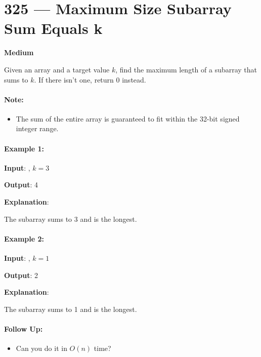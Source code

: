 \section{325 --- Maximum Size Subarray Sum Equals k}

\textbf{Medium}

Given an array  and a target value $k$, find the maximum length of a subarray that sums to $k$. If there isn't one, return 0 instead.

\paragraph{Note:}

\begin{itemize}
\item The sum of the entire  array is guaranteed to fit within the 32-bit signed integer range.
\end{itemize}

\paragraph{Example 1:}

\begin{flushleft}
\textbf{Input}: , $ k = 3 $

\textbf{Output}: 4 

\textbf{Explanation}: 

The subarray \fcj{[1, -1, 5, -2]} sums to 3 and is the longest.
\end{flushleft}

\paragraph{Example 2:}

\begin{flushleft}
\textbf{Input}: , $k = 1$

\textbf{Output}: 2 

\textbf{Explanation}: 

The subarray \fcj{[-1, 2]} sums to 1 and is the longest.

\end{flushleft}

\paragraph{Follow Up:}
\begin{itemize}
\item Can you do it in $O(n)$ time?
\end{itemize}

